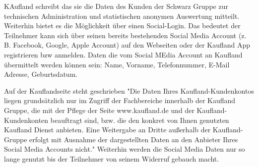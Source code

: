 KAufland schreibt das sie die Daten des Kunden der Schwarz Gruppe zur technischen Administration und statistischen anonymen Auswertung mitteilt.
Weiterhin bietet es die Möglichkeit über einen Social-Login. Das bedeutet der Teilnehmer kann sich über seinen bereits bestehenden Social Media Account (z. B. Facebook, Google, Apple Account) auf den Webseiten oder der Kaufland App registrieren bzw anmelden. Daten die vom Social MEdia Account an Kaufland übermittelt werden können sein: Name, Vorname, Telefonnummer, E-Mail Adresse, Geburtsdatum. 

Auf der Kauflandseite steht geschrieben "Die Daten Ihres Kaufland-Kundenkontos liegen grundsätzlich nur im Zugriff der Fachbereiche innerhalb der Kaufland Gruppe, die mit der Pflege der Seite www.kaufland.de und der Kaufland-Kundenkonten beauftragt sind, bzw. die den konkret von Ihnen genutzten Kaufland Dienst anbieten. Eine Weitergabe an Dritte außerhalb der Kaufland-Gruppe erfolgt mit Ausnahme der dargestellten Daten an den Anbieter Ihres Social Media Accounts nicht." Weiterhin werden die Social Media Daten nur so lange genutzt bis der Teilnehmer von seinem Widerruf gebauch macht. 
\label{Kaufland_Rechtliches}

